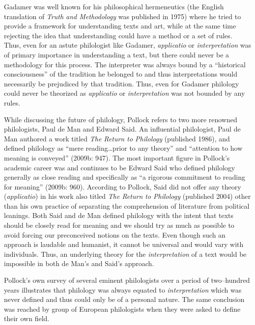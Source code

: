 Gadamer was well known for his philosophical hermeneutics (the English translation of \textit{Truth and Methodology} was published in 1975) where he tried to provide a framework for understanding texts and art, while at the same time rejecting the idea that understanding could have a method or a set of rules. Thus, even for an astute philologist like Gadamer, \textit{applicatio} or \textit{interpretation} was of primary importance in understanding a text, but there could never be a methodology for this process. The interpreter was always bound by a “historical consciousness” of the tradition he belonged to and thus interpretations would necessarily be prejudiced by that tradition. Thus, even for Gadamer philology could never be theorized as \textit{applicatio} or \textit{interpretation} was not bounded by any rules.

While discussing the future of philology, Pollock refers to two more renowned philologists, Paul de Man and Edward Said. An influential philologist, Paul de Man authored a work titled \textit{The Return to Philology} (published 1986), and defined philology as “mere reading…prior to any theory” and “attention to how meaning is conveyed” (2009b: 947). The most important figure in Pollock’s academic career was and continues to be Edward Said who defined philology generally as close reading and specifically as “a rigorous commitment to reading for meaning” (2009b: 960). According to Pollock, Said did not offer any theory (\textit{applicatio}) in his work also titled \textit{The Return to Philology} (published 2004) other than his own practice of separating the comprehension of literature from political leanings. Both Said and de Man defined philology with the intent that texts should be closely read for meaning and we should try as much as possible to avoid forcing our preconceived notions on the texts. Even though such an approach is laudable and humanist, it cannot be universal and would vary with individuals. Thus, an underlying theory for the \textit{interpretation} of a text would be impossible in both de Man’s and Said’s approach.

Pollock’s own survey of several eminent philologists over a period of two–hundred years illustrates that philology was always equated to \textit{interpretation} which was never defined and thus could only be of a personal nature. The same conclusion was reached by group of European philologists when they were asked to define their own field.

